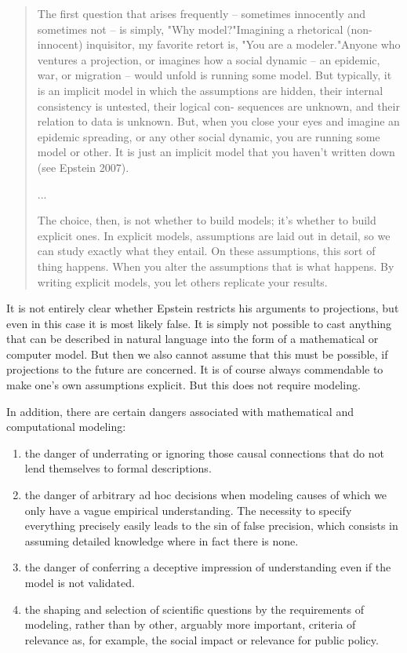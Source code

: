 \documentclass[12pt, english, a4paper]{article}
\begin{document}
\begin{quote}

  The first question that arises frequently -- sometimes innocently
  and sometimes not -- is simply, "Why model?"Imagining a rhetorical
  (non-innocent) inquisitor, my favorite retort is, "You are a
  modeler."Anyone who ventures a projection, or imagines how a social
  dynamic -- an epidemic, war, or migration -- would unfold is running
  some model. But typically, it is an implicit model in which the
  assumptions are hidden, their internal consistency is untested,
  their logical con- sequences are unknown, and their relation to data
  is unknown. But, when you close your eyes and imagine an epidemic
  spreading, or any other social dynamic, you are running some model
  or other. It is just an implicit model that you haven’t written down
  (see Epstein 2007).

  ...

  The choice, then, is not whether to build models; it’s whether to
  build explicit ones. In explicit models, assumptions are laid out in
  detail, so we can study exactly what they entail. On these
  assumptions, this sort of thing happens. When you alter the
  assumptions that is what happens. By writing explicit models, you let
  others replicate your results. \citep[1.2-1.5]{epstein:2008}
\end{quote}

It is not entirely clear whether Epstein restricts his arguments to
projections, but even in this case it is most likely false. It is
simply not possible to cast anything that can be described in natural
language into the form of a mathematical or computer model. But then
we also cannot assume that this must be possible, if projections to
the future are concerned. It is of course always commendable to make
one’s own assumptions explicit. But this does not require modeling.

In addition, there are certain dangers associated with mathematical
and computational modeling:

\begin{enumerate}
\item the danger of underrating or ignoring those causal connections
  that do not lend themselves to formal descriptions.

\item the danger of arbitrary ad hoc decisions when modeling causes of
  which we only have a vague empirical understanding.  The necessity
  to specify everything precisely easily leads to the sin of false
  precision, which consists in assuming detailed knowledge where in
  fact there is none.

\item the danger of conferring a deceptive impression of understanding
  even if the model is not validated.

\item the shaping and selection of scientific questions by the
  requirements of modeling, rather than by other, arguably more
  important, criteria of relevance as, for example, the social impact
  or relevance for public policy.

\end{enumerate}
\end{document}
